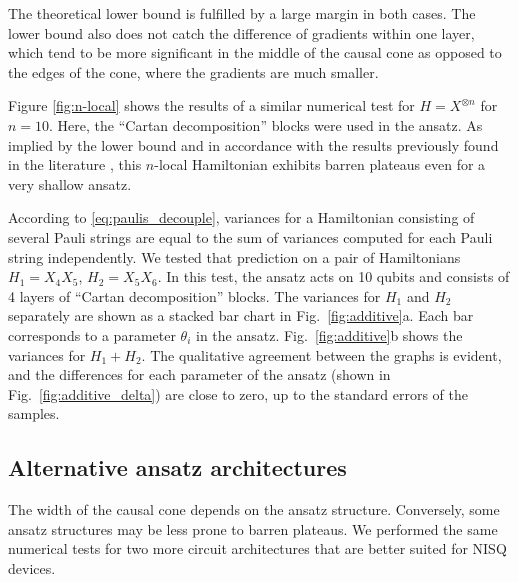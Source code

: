 The theoretical lower bound is fulfilled by a large margin in both cases. The lower bound also does not catch the difference of gradients within one layer, which tend to be more significant in the middle of the causal cone as opposed to the edges of the cone, where the gradients are much smaller.

Figure \ref{fig:n-local} shows the results of a similar numerical test for $H = X^{\otimes n}$ for $n = 10$. Here, the ``Cartan decomposition'' blocks were used in the ansatz. As implied by the lower bound and in accordance with the results previously found in the literature \cite{cerezo_cost-function-dependent_2020}, this $n$-local Hamiltonian exhibits barren plateaus even for a very shallow ansatz.

According to \eqref{eq:paulis_decouple}, variances for a Hamiltonian consisting of several Pauli strings are equal to the sum of variances computed for each Pauli string independently. We tested that prediction on a pair of Hamiltonians $H_1 = X_4 X_5$, $H_2 = X_5 X_6$. In this test, the ansatz acts on 10 qubits and consists of 4 layers of ``Cartan decomposition'' blocks. The variances for $H_1$ and $H_2$ separately are shown as a stacked bar chart in Fig.~\ref{fig:additive}a. Each bar corresponds to a parameter $\theta_i$ in the ansatz. Fig.~\ref{fig:additive}b shows the variances for $H_1 + H_2$. The qualitative agreement between the graphs is evident, and the differences for each parameter of the ansatz (shown in Fig.~\ref{fig:additive_delta}) are close to zero, up to the standard errors of the samples.


\subsection{Alternative ansatz architectures}
\label{subsec:alt_ansatz}

The width of the causal cone depends on the ansatz structure. Conversely, some ansatz structures may be less prone to barren plateaus. We performed the same numerical tests for two more circuit architectures that are better suited for NISQ devices.

